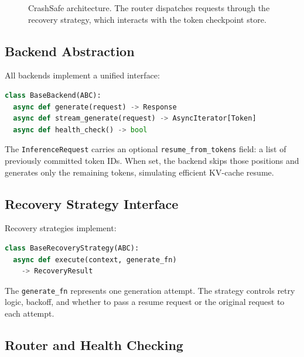 \documentclass[10pt,twocolumn]{article}
\newcommand{\sys}{CrashSafe}
\begin{document}
\begin{figure}[h]
  \centering
  \caption{\sys{} architecture. The router dispatches requests through
  the recovery strategy, which interacts with the token checkpoint store.}
  \label{fig:architecture}
\end{figure}

\subsection{Backend Abstraction}

All backends implement a unified interface:

\begin{lstlisting}[language=Python,caption={Backend interface}]
class BaseBackend(ABC):
  async def generate(request) -> Response
  async def stream_generate(request) -> AsyncIterator[Token]
  async def health_check() -> bool
\end{lstlisting}

The \texttt{InferenceRequest} carries an optional \texttt{resume\_from\_tokens}
field: a list of previously committed token IDs. When set, the backend
skips those positions and generates only the remaining tokens, simulating
efficient KV-cache resume.

\subsection{Recovery Strategy Interface}

Recovery strategies implement:

\begin{lstlisting}[language=Python,caption={Recovery interface}]
class BaseRecoveryStrategy(ABC):
  async def execute(context, generate_fn)
    -> RecoveryResult
\end{lstlisting}

The \texttt{generate\_fn} represents one generation attempt. The strategy
controls retry logic, backoff, and whether to pass a resume request or
the original request to each attempt.

\subsection{Router and Health Checking}
\end{document}
